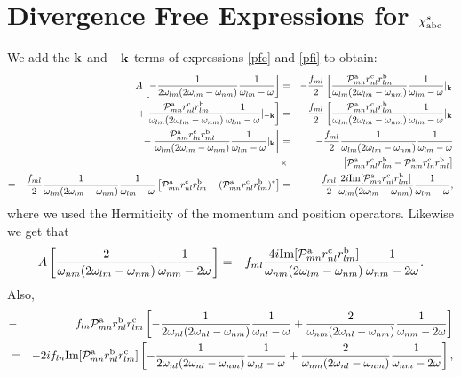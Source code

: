 \documentclass[floatfix,prb,aps,superscriptaddress,11pt,preprint]{revtex4}
\begin{document}
\section{Divergence Free Expressions for $\chi^s_{\mathrm{a}\mathrm{b}\mathrm{c}}$}
We add the $\mathbf{k}$ and $-\mathbf{k}$ terms of expressions \eqref{pfe} and
\eqref{pfi} to obtain:
\begin{eqnarray}\label{chi1}
A
\left[
-\frac{1}{2\omega_{lm}(2\omega_{lm}-\omega_{nm})}\frac{1}{\omega_{lm}-\omega}
\right]&=&-\frac{f_{ml}}{2}
\left[
\frac{{\cal P}^{\mathrm{a}}_{mn}r^{\mathrm{c}}_{nl}r^{\mathrm{b}}_{lm}}{\omega_{lm}(2\omega_{lm}-\omega_{nm})}\frac{1}{\omega_{lm}-\omega}|_{\mathbf{k}}
\right.
\nonumber\\
+
\left.
\frac{{\cal P}^{\mathrm{a}}_{mn}r^{\mathrm{c}}_{nl}r^{\mathrm{b}}_{lm}}{\omega_{lm}(2\omega_{lm}-\omega_{nm})}\frac{1}{\omega_{lm}-\omega}|_{-\mathbf{k}}
\right]
&=&-\frac{f_{ml}}{2}
\left[
\frac{{\cal P}^{\mathrm{a}}_{mn}r^{\mathrm{c}}_{nl}r^{\mathrm{b}}_{lm}}{\omega_{lm}(2\omega_{lm}-\omega_{nm})}\frac{1}{\omega_{lm}-\omega}|_{\mathbf{k}}
\right.
\nonumber\\
-
\left.
\frac{{\cal P}^{\mathrm{a}}_{nm}r^{\mathrm{c}}_{ln}r^{\mathrm{b}}_{ml}}{\omega_{lm}(2\omega_{lm}-\omega_{nm})}\frac{1}{\omega_{lm}-\omega}|_{\mathbf{k}}
\right]
&=&-\frac{f_{ml}}{2}
\frac{1}{\omega_{lm}(2\omega_{lm}-\omega_{nm})}\frac{1}{\omega_{lm}-\omega}
\nonumber\\
&\times&
\left[
{\cal P}^{\mathrm{a}}_{mn}r^{\mathrm{c}}_{nl}r^{\mathrm{b}}_{lm}
-
{\cal P}^{\mathrm{a}}_{nm}r^{\mathrm{c}}_{ln}r^{\mathrm{b}}_{ml}
\right]
\\
=-\frac{f_{ml}}{2}
\frac{1}{\omega_{lm}(2\omega_{lm}-\omega_{nm})}\frac{1}{\omega_{lm}-\omega}
\left[
{\cal P}^{\mathrm{a}}_{mn}r^{\mathrm{c}}_{nl}r^{\mathrm{b}}_{lm}
-
({\cal P}^{\mathrm{a}}_{mn}r^{\mathrm{c}}_{nl}r^{\mathrm{b}}_{lm})^*
\right]
&=&-\frac{f_{ml}}{2}
\frac{2i\mathrm{Im}[{\cal P}^{\mathrm{a}}_{mn}r^{\mathrm{c}}_{nl}r^{\mathrm{b}}_{lm}]}{\omega_{lm}(2\omega_{lm}-\omega_{nm})}\frac{1}{\omega_{lm}-\omega}
\nonumber
,
\end{eqnarray}
where we used the Hermiticity of the momentum and position operators.
Likewise we get that
\begin{eqnarray}\label{si}
A
\left[
\frac{2}{\omega_{nm}(2\omega_{lm}-\omega_{nm})}\frac{1}{\omega_{nm}-2\omega}
\right]&=&
f_{ml}
\frac{4i\mathrm{Im}[{\cal P}^{\mathrm{a}}_{mn}r^{\mathrm{c}}_{nl}r^{\mathrm{b}}_{lm}]}{\omega_{nm}(2\omega_{lm}-\omega_{nm})}\frac{1}{\omega_{nm}-2\omega}
.
\end{eqnarray}
Also,
\begin{eqnarray}\label{is}
&-&
f_{ln}{\cal P}^{\mathrm{a}}_{mn}r^{\mathrm{b}}_{nl}r^{\mathrm{c}}_{lm}
\left[
-\frac{1}{2\omega_{nl}(2\omega_{nl}-\omega_{nm})}\frac{1}{\omega_{nl}-\omega}
+\frac{2}{\omega_{nm}(2\omega_{nl}-\omega_{nm})}\frac{1}{\omega_{nm}-2\omega}
\right]
\nonumber\\
&=&
-
2if_{ln}\mathrm{Im}[{\cal P}^{\mathrm{a}}_{mn}r^{\mathrm{b}}_{nl}r^{\mathrm{c}}_{lm}]
\left[
-\frac{1}{2\omega_{nl}(2\omega_{nl}-\omega_{nm})}\frac{1}{\omega_{nl}-\omega}
+\frac{2}{\omega_{nm}(2\omega_{nl}-\omega_{nm})}\frac{1}{\omega_{nm}-2\omega}
\right]
,
\end{eqnarray}
\end{document}
